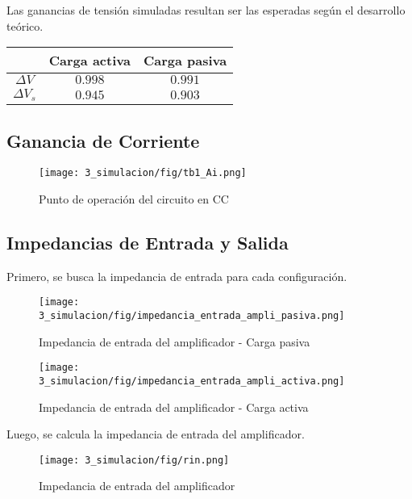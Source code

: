 Las ganancias de tensión simuladas resultan ser las esperadas según el desarrollo teórico.
\begin{table}[H]
    \centering
    \begin{tabular}{|c|c|c|}
    \hline
                        & Carga activa & Carga pasiva  \\ \hline
    $\Delta V$        & $0.998$   & $0.991$    \\ \hline
    $\Delta V_s$        & $0.945$   & $0.903$  \\ \hline
    \end{tabular}
    \end{table}


\subsection{Ganancia de Corriente}

\begin{figure}[H]
    \centering
    \texttt{[image: 3\_simulacion/fig/tb1\_Ai.png]}
    \label{mediciones_pol_activa}
    \caption{Punto de operación del circuito en CC}
\end{figure}




\subsection{Impedancias de Entrada y Salida}
Primero, se busca la impedancia de entrada para cada configuración.

\begin{figure}[H]
    \centering
    \texttt{[image: 3\_simulacion/fig/impedancia\_entrada\_ampli\_pasiva.png]}
    \label{mediciones_pol_activa}
    \caption{Impedancia de entrada del amplificador - Carga pasiva}
\end{figure}

\begin{figure}[H]
    \centering
    \texttt{[image: 3\_simulacion/fig/impedancia\_entrada\_ampli\_activa.png]}
    \label{mediciones_pol_activa}
    \caption{Impedancia de entrada del amplificador - Carga activa}
\end{figure}

Luego, se calcula la impedancia de entrada del amplificador.
\begin{figure}[H]
    \centering
    \texttt{[image: 3\_simulacion/fig/rin.png]}
    \label{mediciones_pol_activa}
    \caption{Impedancia de entrada del amplificador}
\end{figure}

